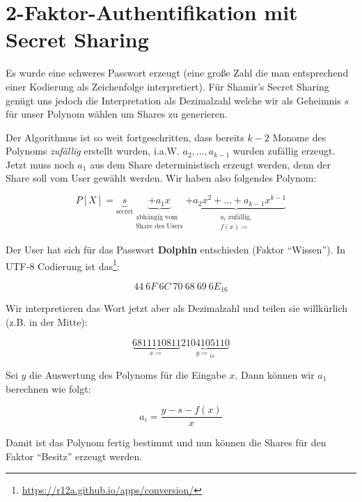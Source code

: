 \documentclass[12pt,a4paper]{scrartcl}
\begin{document}
\thispagestyle{empty}

\section*{2-Faktor-Authentifikation mit Secret Sharing}

Es wurde eine schweres Passwort erzeugt (eine große Zahl die man entsprechend einer Kodierung als Zeichenfolge interpretiert). Für Shamir's Secret Sharing genügt uns jedoch die Interpretation als Dezimalzahl welche wir als Geheimnis $s$ für unser Polynom wählen um Shares zu generieren.

Der Algorithmus ist so weit fortgeschritten, dass bereits $k-2$ Monome des Polynoms \textit{zufällig} erstellt wurden, i.a.W. $a_2,\ldots,a_{k-1}$ wurden zufällig erzeugt. Jetzt muss noch $a_1$ aus dem Share deterministisch erzeugt werden, denn der Share soll vom User gewählt werden. Wir haben also folgendes Polynom:

\begin{equation*}
P[X]=\underbrace{s}_\text{secret}\underbrace{+ a_1 x}_{\substack{\text{abhängig vom} \\ \text{Share des Users}}} \underbrace{+ a_2 x^2 + \ldots + a_{k-1}x^{k-1}}_{\substack{\text{$a_i$ zufällig,} \\ f(x)\coloneqq}}
\end{equation*}

Der User hat sich für das Passwort \textbf{Dolphin} entschieden (Faktor \enquote{Wissen}). In UTF-8 Codierung ist das\footnote{\url{https://r12a.github.io/apps/conversion/}}:

\begin{equation*}
44\ 6F\ 6C\ 70\ 68\ 69\ 6E_{16}
\end{equation*}

Wir interpretieren das Wort jetzt aber als Dezimalzahl und teilen sie willkürlich (z.B. in der Mitte):

\begin{equation*}
\underbrace{6811110811}_{x\coloneqq} \underbrace{2104105110}_{y\coloneqq}_{10}
\end{equation*}

Sei $y$ die Auswertung des Polynoms für die Eingabe $x$. Dann können wir $a_1$ berechnen wie folgt:

\begin{equation*}
a_i = \frac{y-s-f(x)}{x}
\end{equation*}

Damit ist das Polynom fertig bestimmt und nun können die Shares für den Faktor \enquote{Besitz} erzeugt werden. 
\end{document}
